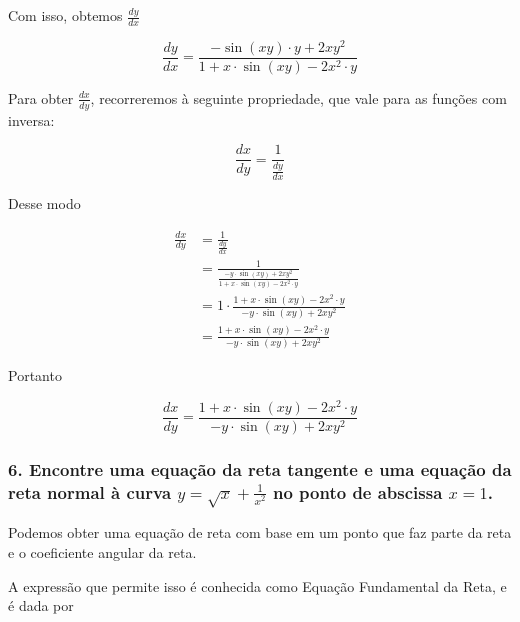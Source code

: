 \documentclass{article}
\begin{document}
Com isso, obtemos \(\frac{dy}{dx}\)

\begin{equation}\label{eq:dy_dx}
    \frac{dy}{dx}
    =
    \frac{
        -
        \sin(xy)
        \cdot
        y
        + 2xy^2
    }{
        1
        +
        x \cdot \sin(xy)
        -
        2
        x^2
        \cdot
        y
    }
\end{equation}

Para obter \(\frac{dx}{dy}\), recorreremos à seguinte propriedade,
que vale para as funções com inversa:

\[
    \frac{dx}{dy}
    =
    \frac{1}{\frac{dy}{dx}}
\]

Desse modo

\begin{align*}
    \frac{dx}{dy}
     & =
    \frac{1}{\frac{dy}{dx}}
    \\ &=
    \frac{1}{
        \frac{
            - y \cdot \sin(xy) + 2xy^2
        }{
            1
            +
            x \cdot \sin(xy)
            -
            2
            x^2
            \cdot
            y
        }
    }
    \\ &=
    1
    \cdot
    \frac{
        1
        +
        x \cdot \sin(xy)
        -
        2
        x^2
        \cdot
        y
    }{
        - y \cdot \sin(xy) + 2xy^2
    }
    \\ &=
    \frac{
        1
        +
        x \cdot \sin(xy)
        -
        2
        x^2
        \cdot
        y
    }{
        - y \cdot \sin(xy) + 2xy^2
    }
\end{align*}

Portanto

\begin{equation}
    \frac{dx}{dy}
    =
    \frac{
        1
        +
        x \cdot \sin(xy)
        -
        2
        x^2
        \cdot
        y
    }{
        - y \cdot \sin(xy) + 2xy^2
    }
\end{equation}

\subsubsection*{6. Encontre uma equação da reta tangente e uma equação da reta normal à curva \(y = \sqrt{x} + \frac{1}{x^2}\) no ponto de abscissa \(x=1\).}

Podemos obter uma equação de reta com base em um ponto que faz parte da reta
e o coeficiente angular da reta.

A expressão que permite isso é conhecida como Equação Fundamental
da Reta, e é dada por
\end{document}

